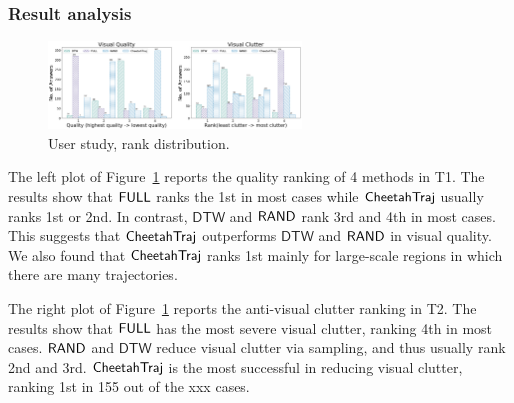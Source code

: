 
\subsubsection{Result analysis}

\begin{figure}[t]
	\centering
	\includegraphics[width=0.6\textwidth]{pictures/user_study/rank.png}
	\caption{User study, rank distribution.}
	\label{fig:rank}
\end{figure}

The left plot of Figure~\ref{fig:rank} reports the quality ranking of 4 methods in T1. The results show that $\mathsf{FULL}$ ranks the 1st in most cases while $\mathsf{CheetahTraj}$ usually ranks 1st or 2nd. In contrast, $\mathsf{DTW}$ and $\mathsf{RAND}$ rank 3rd and 4th in most cases. This suggests that $\mathsf{CheetahTraj}$ outperforms $\mathsf{DTW}$ and $\mathsf{RAND}$ in visual quality. We also found that $\mathsf{CheetahTraj}$ ranks 1st mainly for large-scale regions in which there are many trajectories.         

 

The right plot of Figure~\ref{fig:rank} reports the anti-visual clutter ranking in T2. The results show that $\mathsf{FULL}$ has the most severe visual clutter, ranking 4th in most cases. $\mathsf{RAND}$ and $\mathsf{DTW}$ reduce visual clutter via sampling, and thus usually rank 2nd and 3rd. $\mathsf{CheetahTraj}$ is the most successful in reducing visual clutter, ranking 1st in 155 out of the xxx cases.       

